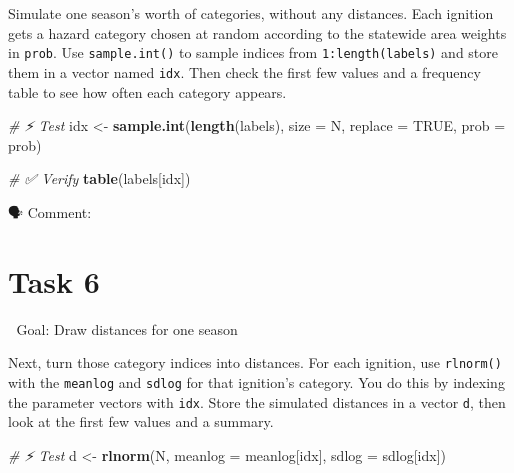 \documentclass[
  12pt,
]{scrreprt}
\newenvironment{Shaded}{\begin{snugshade}}{\end{snugshade}}
\newcommand{\AttributeTok}[1]{\textcolor[rgb]{0.13,0.29,0.53}{#1}}
\newcommand{\CommentTok}[1]{\textcolor[rgb]{0.56,0.35,0.01}{\textit{#1}}}
\newcommand{\ConstantTok}[1]{\textcolor[rgb]{0.56,0.35,0.01}{#1}}
\newcommand{\FunctionTok}[1]{\textcolor[rgb]{0.13,0.29,0.53}{\textbf{#1}}}
\newcommand{\NormalTok}[1]{#1}
\newcommand{\OtherTok}[1]{\textcolor[rgb]{0.56,0.35,0.01}{#1}}
\begin{document}
Simulate one season's worth of categories, without any distances. Each ignition gets a hazard category chosen at random according to the statewide area weights in \texttt{prob}. Use \texttt{sample.int()} to sample indices from \texttt{1:length(labels)} and store them in a vector named \texttt{idx}. Then check the first few values and a frequency table to see how often each category appears.

\begin{Shaded}
\begin{Highlighting}[]
\CommentTok{\# ⚡ Test}
\NormalTok{idx }\OtherTok{\textless{}{-}} \FunctionTok{sample.int}\NormalTok{(}\FunctionTok{length}\NormalTok{(labels),}
                  \AttributeTok{size    =}\NormalTok{ N,}
                  \AttributeTok{replace =} \ConstantTok{TRUE}\NormalTok{,}
                  \AttributeTok{prob    =}\NormalTok{ prob)}
\end{Highlighting}
\end{Shaded}

\begin{Shaded}
\begin{Highlighting}[]
\CommentTok{\# ✅  Verify}
\FunctionTok{table}\NormalTok{(labels[idx])}
\end{Highlighting}
\end{Shaded}

🗣 Comment:

\section{Task 6}\label{task-6}

🎯 Goal: Draw distances for one season

Next, turn those category indices into distances. For each ignition, use \texttt{rlnorm()} with the \texttt{meanlog} and \texttt{sdlog} for that ignition's category. You do this by indexing the parameter vectors with \texttt{idx}. Store the simulated distances in a vector \texttt{d}, then look at the first few values and a summary.

\begin{Shaded}
\begin{Highlighting}[]
\CommentTok{\# ⚡ Test}
\NormalTok{d }\OtherTok{\textless{}{-}} \FunctionTok{rlnorm}\NormalTok{(N,}
            \AttributeTok{meanlog =}\NormalTok{ meanlog[idx],}
            \AttributeTok{sdlog   =}\NormalTok{ sdlog[idx])}
\end{Highlighting}
\end{Shaded}
\end{document}

